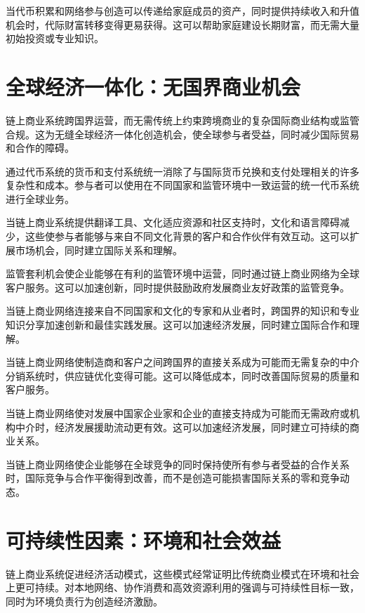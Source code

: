 \documentclass[
  Letterpaper,
]{scrbook}
\begin{document}
当代币积累和网络参与创造可以传递给家庭成员的资产，同时提供持续收入和升值机会时，代际财富转移变得更易获得。这可以帮助家庭建设长期财富，而无需大量初始投资或专业知识。

\section{全球经济一体化：无国界商业机会}\label{ux5168ux7403ux7ecfux6d4eux4e00ux4f53ux5316ux65e0ux56fdux754cux5546ux4e1aux673aux4f1a}

链上商业系统跨国界运营，而无需传统上约束跨境商业的复杂国际商业结构或监管合规。这为无缝全球经济一体化创造机会，使全球参与者受益，同时减少国际贸易和合作的障碍。

通过代币系统的货币和支付系统统一消除了与国际货币兑换和支付处理相关的许多复杂性和成本。参与者可以使用在不同国家和监管环境中一致运营的统一代币系统进行全球业务。

当链上商业系统提供翻译工具、文化适应资源和社区支持时，文化和语言障碍减少，这些使参与者能够与来自不同文化背景的客户和合作伙伴有效互动。这可以扩展市场机会，同时建立国际关系和理解。

监管套利机会使企业能够在有利的监管环境中运营，同时通过链上商业网络为全球客户服务。这可以加速创新，同时提供鼓励政府发展商业友好政策的监管竞争。

当链上商业网络连接来自不同国家和文化的专家和从业者时，跨国界的知识和专业知识分享加速创新和最佳实践发展。这可以加速经济发展，同时建立国际合作和理解。

当链上商业网络使制造商和客户之间跨国界的直接关系成为可能而无需复杂的中介分销系统时，供应链优化变得可能。这可以降低成本，同时改善国际贸易的质量和客户服务。

当链上商业网络使对发展中国家企业家和企业的直接支持成为可能而无需政府或机构中介时，经济发展援助流动更有效。这可以加速经济发展，同时建立可持续的商业关系。

当链上商业网络使企业能够在全球竞争的同时保持使所有参与者受益的合作关系时，国际竞争与合作平衡得到改善，而不是创造可能损害国际关系的零和竞争动态。

\section{可持续性因素：环境和社会效益}\label{ux53efux6301ux7eedux6027ux56e0ux7d20ux73afux5883ux548cux793eux4f1aux6548ux76ca}

链上商业系统促进经济活动模式，这些模式经常证明比传统商业模式在环境和社会上更可持续。对本地网络、协作消费和高效资源利用的强调与可持续性目标一致，同时为环境负责行为创造经济激励。
\end{document}
